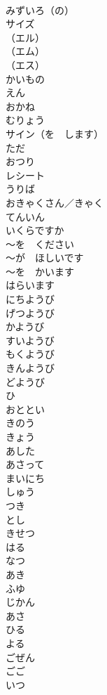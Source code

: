 \documentclass[8pt]{extreport}
\begin{document}
\begin{CJK}{UTF8}{min}
\\	みずいろ（の）	
\\	サイズ	
\\	（エル）	
\\	（エム）	
\\	（エス）	
\\	かいもの	
\\	えん	
\\	おかね	
\\	むりょう	
\\	サイン（を　します）	
\\	ただ	
\\	おつり	
\\	レシート	
\\	うりば	
\\	おきゃくさん／きゃく	
\\	てんいん	
\\	いくらですか	
\\	～を　ください	
\\	～が　ほしいです	
\\	～を　かいます	
\\	はらいます	
\\	にちようび	
\\	げつようび	
\\	かようび	
\\	すいようび	
\\	もくようび	
\\	きんようび	
\\	どようび	
\\	ひ	
\\	おととい	
\\	きのう	
\\	きょう	
\\	あした	
\\	あさって	
\\	まいにち	
\\	しゅう	
\\	つき	
\\	とし	
\\	きせつ	
\\	はる	
\\	なつ	
\\	あき	
\\	ふゆ	
\\	じかん	
\\	あさ	
\\	ひる	
\\	よる	
\\	ごぜん	
\\	ごご	
\\	いつ	

\end{CJK}
\end{document}
